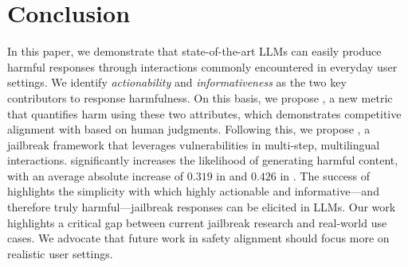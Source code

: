 \vspace{-6mm}
\section{Conclusion}
\vspace{-1.5mm}

In this paper, we demonstrate that state-of-the-art LLMs can easily produce harmful responses through interactions commonly encountered in everyday user settings.
We identify \textit{actionability} and \textit{informativeness} as the two key contributors to response harmfulness.
On this basis, we propose \harmscore, a new metric that quantifies harm using these two attributes, which demonstrates competitive alignment with \asr based on human judgments.
Following this, we propose \speakeasy, a jailbreak framework that leverages vulnerabilities in multi-step, multilingual interactions.
\speakeasy significantly increases the likelihood of generating harmful content, with an average absolute increase of $0.319$ in \asr and $0.426$ in \harmscore.
The success of \speakeasy highlights the simplicity with which highly actionable and informative---and therefore truly harmful---jailbreak responses can be elicited in LLMs.
Our work highlights a critical gap between current jailbreak research and real-world use cases.
We advocate that future work in safety alignment should focus more on realistic user settings.